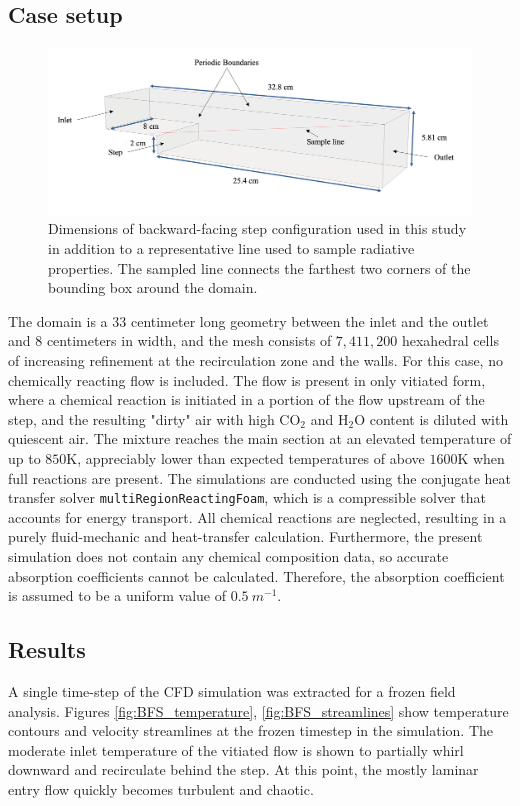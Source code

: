 \subsection{Case setup}

\begin{figure}
\includegraphics[width=\linewidth]{figures/ch4/BFS_geometry.png}
\caption{Dimensions of backward-facing step configuration used in this study in addition to a representative line used to sample radiative properties. The sampled line connects the farthest two corners of the bounding box around the domain.}
\label{fig:BFS_geometry}
\end{figure}

The domain is a $33$ centimeter long geometry between the inlet and the outlet and $8$ centimeters in width, and the mesh consists of $7,411,200$ hexahedral cells of increasing refinement at the recirculation zone and the walls.
For this case, no chemically reacting flow is included. 
The flow is present in only vitiated form, where a chemical reaction is initiated in a portion of the flow upstream of the step, and the resulting "dirty" air with high CO$_2$ and H$_2$O content is diluted with quiescent air. 
The mixture reaches the main section at an elevated temperature of up to $850$K, appreciably lower than expected temperatures of above $1600$K when full reactions are present. 
The simulations are conducted using the conjugate heat transfer solver \texttt{multiRegionReactingFoam}, which is a compressible solver that accounts for energy transport. All chemical reactions are neglected, resulting in a purely fluid-mechanic and heat-transfer calculation. Furthermore, the present simulation does not contain any chemical composition data, so accurate absorption coefficients cannot be calculated. Therefore, the absorption coefficient is assumed to be a uniform value of $0.5~m^{-1}$.



\subsection{Results}
A single time-step of the CFD simulation was extracted for a frozen field analysis. 
Figures \ref{fig:BFS_temperature}, \ref{fig:BFS_streamlines} show temperature contours and velocity streamlines at the frozen timestep in the simulation. The moderate inlet temperature of the vitiated flow is shown to partially whirl downward and recirculate behind the step. At this point, the mostly laminar entry flow quickly becomes turbulent and chaotic.

